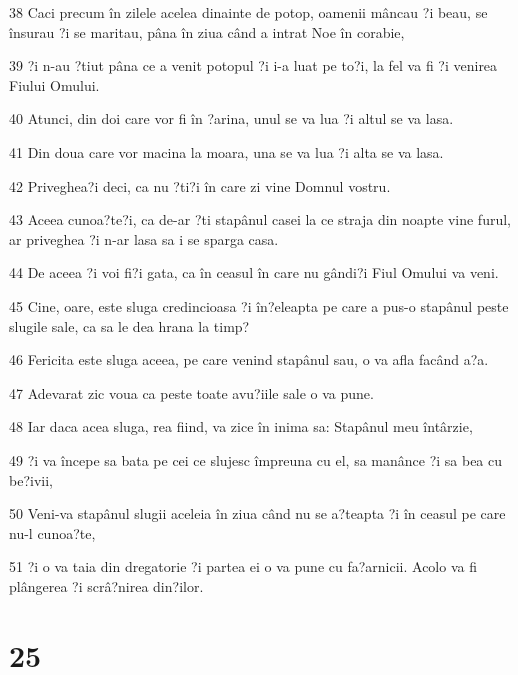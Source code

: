 \par 38 Caci precum în zilele acelea dinainte de potop, oamenii mâncau ?i beau, se însurau ?i se maritau, pâna în ziua când a intrat Noe în corabie,
\par 39 ?i n-au ?tiut pâna ce a venit potopul ?i i-a luat pe to?i, la fel va fi ?i venirea Fiului Omului.
\par 40 Atunci, din doi care vor fi în ?arina, unul se va lua ?i altul se va lasa.
\par 41 Din doua care vor macina la moara, una se va lua ?i alta se va lasa.
\par 42 Priveghea?i deci, ca nu ?ti?i în care zi vine Domnul vostru.
\par 43 Aceea cunoa?te?i, ca de-ar ?ti stapânul casei la ce straja din noapte vine furul, ar priveghea ?i n-ar lasa sa i se sparga casa.
\par 44 De aceea ?i voi fi?i gata, ca în ceasul în care nu gândi?i Fiul Omului va veni.
\par 45 Cine, oare, este sluga credincioasa ?i în?eleapta pe care a pus-o stapânul peste slugile sale, ca sa le dea hrana la timp?
\par 46 Fericita este sluga aceea, pe care venind stapânul sau, o va afla facând a?a.
\par 47 Adevarat zic voua ca peste toate avu?iile sale o va pune.
\par 48 Iar daca acea sluga, rea fiind, va zice în inima sa: Stapânul meu întârzie,
\par 49 ?i va începe sa bata pe cei ce slujesc împreuna cu el, sa manânce ?i sa bea cu be?ivii,
\par 50 Veni-va stapânul slugii aceleia în ziua când nu se a?teapta ?i în ceasul pe care nu-l cunoa?te,
\par 51 ?i o va taia din dregatorie ?i partea ei o va pune cu fa?arnicii. Acolo va fi plângerea ?i scrâ?nirea din?ilor.

\chapter{25}

